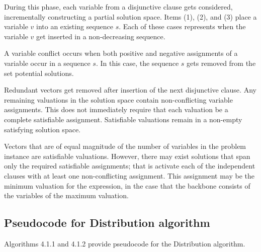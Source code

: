 \FloatBarrier

		
During this phase, each variable from a disjunctive clause gets considered, incrementally constructing a partial solution space.  Items (1), (2), and (3) place a variable $v$ into an existing sequence $s$.  Each of these cases represents when the variable $v$ get inserted in a non-decreasing sequence.

A variable conflict occurs when both positive and negative assignments of a variable occur in a sequence $s$.  In this case, the sequence $s$ gets removed from the set potential solutions.

Redundant vectors get removed after insertion of the next disjunctive clause.  Any remaining valuations in the solution space contain non-conflicting variable assignments.  This does not immediately require that each valuation be a complete satisfiable assignment. Satisfiable valuations remain in a non-empty satisfying solution space.
		
		




Vectors that are of equal magnitude of the number of variables in the problem instance are satisfiable valuations.  However, there may exist solutions that span only the required satisfiable assignments; that is activate each of the independent clauses with at least one non-conflicting assignment.  This assignment may be the minimum valuation for the expression, in the case that the backbone consists of the variables of the maximum valuation.

		
	\subsection{Pseudocode for Distribution algorithm}

Algorithms 4.1.1 and 4.1.2 provide pseudocode for the Distribution algorithm.  





%
%
%	


